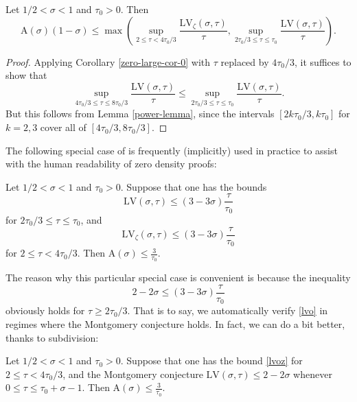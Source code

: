 \documentclass[a4paper, 10pt]{amsart}
\newcommand{\LV}{\mathrm{LV}}
\newcommand{\A}{\mathrm{A}}
\begin{document}
\begin{corollary}\label{zero-large-cor} Let $1/2 < \sigma < 1$ and $\tau_0 > 0$.  Then
$$ \A(\sigma)(1-\sigma) \leq \max \left(\sup_{2 \leq \tau < 4\tau_0/3} \frac{\LV_\zeta(\sigma,\tau)}{\tau}, \sup_{2\tau_0/3 \leq \tau \leq \tau_0} \frac{\LV(\sigma,\tau)}{\tau}\right).$$
\end{corollary}

\begin{proof}  Applying Corollary \ref{zero-large-cor-0} with $\tau$ replaced by $4\tau_0/3$, it suffices to show that
$$\sup_{4\tau_0/3 \leq \tau \leq 8\tau_0/3} \frac{\LV(\sigma,\tau)}{\tau} \leq \sup_{2\tau_0/3 \leq \tau \leq \tau_0} \frac{\LV(\sigma,\tau)}{\tau}.$$
But this follows from Lemma \ref{power-lemma}, since the intervals $[2k\tau_0/3, k\tau_0]$ for $k=2,3$ cover all of $[4\tau_0/3,8\tau_0/3]$.
\end{proof}

The following special case of  is frequently (implicitly) used in practice to assist with the human readability of zero density proofs:

\begin{corollary}\label{zero-large-cor2} Let $1/2 < \sigma < 1$ and $\tau_0 > 0$.  Suppose that one has the bounds
\begin{equation}\label{lvo}
\LV(\sigma,\tau) \leq (3-3\sigma) \frac{\tau}{\tau_0}
\end{equation}
for $2\tau_0/3 \leq \tau \leq \tau_0$, and
\begin{equation}\label{lvoz}
 \LV_\zeta(\sigma,\tau) \leq (3-3\sigma) \frac{\tau}{\tau_0}
\end{equation}
for $2 \leq \tau < 4\tau_0/3$.  Then $\A(\sigma) \leq \frac{3}{\tau_0}$.
\end{corollary}

The reason why this particular special case is convenient is because the inequality
\begin{equation}\label{obvious}
    2 - 2\sigma \leq (3-3\sigma) \frac{\tau}{\tau_0}
\end{equation}
obviously holds for $\tau \geq 2\tau_0/3$.  That is to say, we automatically verify \eqref{lvo} in regimes where the Montgomery conjecture holds. In fact, we can do a bit better, thanks to subdivision:

\begin{corollary}\label{zero-large-cor3} Let $1/2 < \sigma < 1$ and $\tau_0 > 0$. Suppose that one has the bound \eqref{lvoz}
   for $2 \leq \tau < 4\tau_0/3$, and the Montgomery conjecture $\LV(\sigma,\tau) \leq 2-2\sigma$ whenever $0 \leq \tau \leq \tau_0+\sigma-1$.  Then $\A(\sigma) \leq \frac{3}{\tau_0}$.
\end{corollary}
\end{document}
